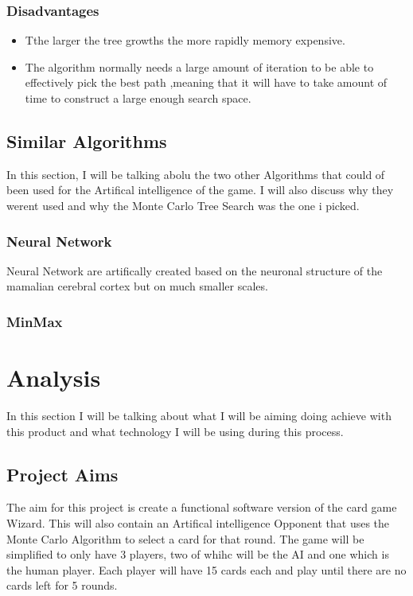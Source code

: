 \subsubsection{Disadvantages}
\begin{itemize}
\item Tthe larger the tree growths the more rapidly memory expensive.
\item The algorithm normally needs a large amount of iteration to be able to effectively pick the best path ,meaning that it will have to take amount of time to construct a large enough search space.
\end{itemize}

\subsection{Similar Algorithms}
In this section, I will be talking abolu the two other Algorithms that could of been used for the Artifical intelligence of the game. I will also discuss why they werent used and why the Monte Carlo Tree Search was the one i picked.
\subsubsection{Neural Network}
Neural Network are artifically created based on the neuronal structure of the mamalian cerebral cortex but on much smaller scales.\cite{NeuralNetwork}
\subsubsection{MinMax}


\section{Analysis}
In this section I will be talking about what I will be aiming doing achieve with this product and what technology I will be using during this process. 
\subsection{Project Aims}
The aim for this project is create a functional software version of the card game Wizard. This will also contain an Artifical intelligence Opponent that uses the Monte Carlo Algorithm to select a card for that round. The game will be simplified to only have 3 players, two of whihc will be the AI and one which is the human player. Each player will have 15 cards each and play until there are no cards left for 5 rounds. 
